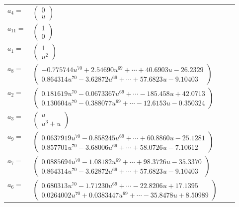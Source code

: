 \documentclass[1p]{elsarticle_modified}
\theoremstyle{definition}
\begin{document}
\begin{tabular}{m{7pt} m{180pt} m{7pt} m{180pt} }
\flushright $a_{4}=$&$\begin{pmatrix}0\\u\end{pmatrix}$ \\
\flushright $a_{11}=$&$\begin{pmatrix}1\\0\end{pmatrix}$ \\
\flushright $a_{1}=$&$\begin{pmatrix}1\\u^2\end{pmatrix}$ \\
\flushright $a_{8}=$&$\begin{pmatrix}-0.775744 u^{70}+2.54690 u^{69}+\cdots+40.6903 u-26.2329\\0.864314 u^{70}-3.62872 u^{69}+\cdots+57.6823 u-9.10403\end{pmatrix}$ \\
\flushright $a_{2}=$&$\begin{pmatrix}0.181619 u^{70}-0.0673367 u^{69}+\cdots-185.458 u+42.0713\\0.130604 u^{70}-0.388077 u^{69}+\cdots-12.6153 u-0.350324\end{pmatrix}$ \\
\flushright $a_{3}=$&$\begin{pmatrix}u\\u^3+u\end{pmatrix}$ \\
\flushright $a_{9}=$&$\begin{pmatrix}0.0637919 u^{70}-0.858245 u^{69}+\cdots+60.8860 u-25.1281\\0.857701 u^{70}-3.68006 u^{69}+\cdots+58.0726 u-7.10612\end{pmatrix}$ \\
\flushright $a_{7}=$&$\begin{pmatrix}0.0885694 u^{70}-1.08182 u^{69}+\cdots+98.3726 u-35.3370\\0.864314 u^{70}-3.62872 u^{69}+\cdots+57.6823 u-9.10403\end{pmatrix}$ \\
\flushright $a_{6}=$&$\begin{pmatrix}0.680313 u^{70}-1.71230 u^{69}+\cdots-22.8206 u+17.1395\\0.0264002 u^{70}+0.0383447 u^{69}+\cdots-35.8478 u+8.50989\end{pmatrix}$ \\

\end{tabular}
\end{document}
